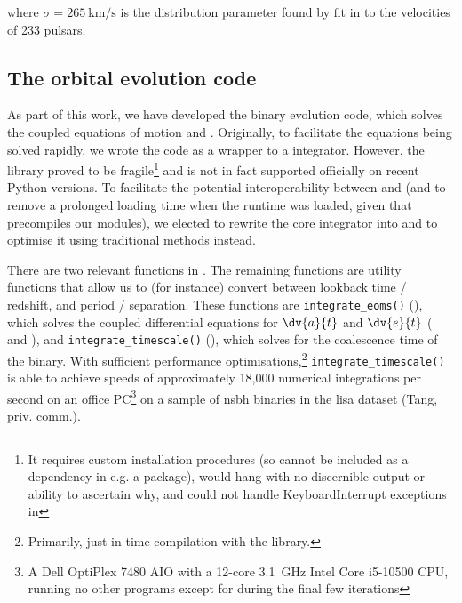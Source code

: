 where $\sigma=\SI{265}{\km\per\s}$ is the distribution parameter found by fit in \citet{Hobbs:2005} to the velocities of 233 pulsars.

\subsection{The  orbital evolution code}\label{chap:numerical_methods_takahe}

As part of this work, we have developed the  binary evolution code, which solves the coupled equations of motion  and . Originally, to facilitate the equations being solved rapidly, we wrote the code as a  wrapper to a  \citep{Bezanson:2017} integrator. However, the  library \citep{Arakaki:2023} proved to be fragile\footnote{It requires custom installation procedures (so cannot be included as a dependency in e.g. a  package), would hang with no discernible output or ability to ascertain why, and could not handle KeyboardInterrupt exceptions in } and is not in fact supported officially on recent Python versions. To facilitate the potential interoperability between  and  (and to remove a prolonged loading time when the  runtime was loaded, given that  precompiles our modules), we elected to rewrite the core integrator into  and to optimise it using traditional  methods instead.

There are two relevant functions in . The remaining functions are utility functions that allow us to (for instance) convert between lookback time / redshift, and period / separation. These functions are \texttt{integrate_eoms()} (), which solves the coupled differential equations for $\dv{a}{t}$ and $\dv{e}{t}$ ( and ), and \texttt{integrate_timescale()} (), which solves  for the coalescence time of the binary. With sufficient performance optimisations,\footnote{Primarily, just-in-time compilation with the  \citep{Lam:2015} library.} \texttt{integrate_timescale()} is able to achieve speeds of approximately 18,000 numerical integrations per second on an office PC\footnote{A Dell OptiPlex 7480 AIO with a 12-core \SI{3.1}{\giga\hertz} Intel Core i5-10500 CPU, running no other programs except for during the final few iterations} on a sample of \gls{nsbh} binaries in the \gls{lisa} dataset (Tang, priv. comm.).

